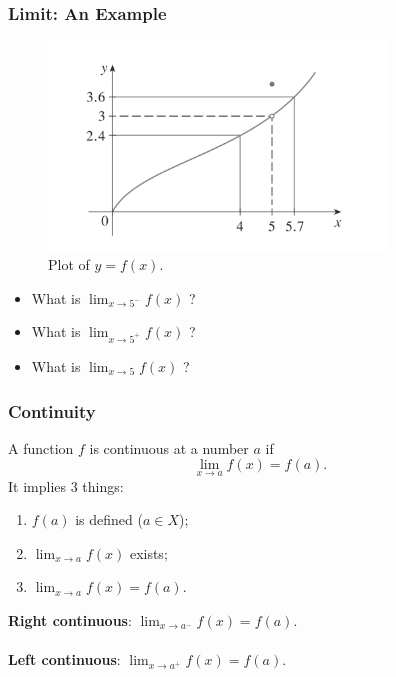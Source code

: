 \documentclass{beamer}
\begin{document}

\begin{frame}
\frametitle{Limit: An Example}
\begin{figure}[H]
\centering
\includegraphics[width=9cm]{Function-limit-eg.png}
\caption{Plot of $y=f(x)$.}
\end{figure}
\begin{itemize}
\item What is $\lim_{x\rightarrow 5^{-}}f(x)$ ?
\item What is $\lim_{x\rightarrow 5^{+}}f(x)$ ?
\item What is $\lim_{x\rightarrow 5}f(x)$ ?
\end{itemize}
\end{frame}


\begin{frame}
\frametitle{Continuity}
A function $f$ is continuous at a number $a$ if
$$
\lim_{x \rightarrow a} f(x) = f(a).
$$
It implies 3 things:
\begin{enumerate}
\item $f(a)$ is defined ($a \in X$);
\item $\lim_{x \rightarrow a} f(x)$ exists;
\item $\lim_{x \rightarrow a} f(x) = f(a)$.
\end{enumerate}
\vspace*{0.15in}
\textbf{Right continuous}: $\lim_{x \rightarrow a^{-}} f(x) = f(a)$.
\\~\\
\textbf{Left continuous}: $\lim_{x \rightarrow a^{+}} f(x) = f(a)$.

\end{frame}
\end{document}
